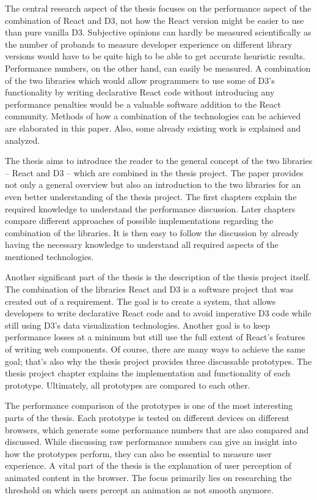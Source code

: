 The central research aspect of the thesis focuses on the performance aspect of the combination of React and D3, not how the React version might be easier to use than pure vanilla D3. Subjective opinions can hardly be measured scientifically as the number of probands to measure developer experience on different library versions would have to be quite high to be able to get accurate heuristic results. Performance numbers, on the other hand, can easily be measured. A combination of the two libraries which would allow programmers to use some of D3's functionality by writing declarative React code without introducing any performance penalties would be a valuable software addition to the React community. Methods of how a combination of the technologies can be achieved are elaborated in this paper. Also, some already existing work is explained and analyzed.

The thesis aims to introduce the reader to the general concept of the two libraries -- React and D3 -- which are combined in the thesis project. The paper provides not only a general overview but also an introduction to the two libraries for an even better understanding of the thesis project. The first chapters explain the required knowledge to understand the performance discussion. Later chapters compare different approaches of possible implementations regarding the combination of the libraries. It is then easy to follow the discussion by already having the necessary knowledge to understand all required aspects of the mentioned technologies.

Another significant part of the thesis is the description of the thesis project itself. The combination of the libraries React and D3 is a software project that was created out of a requirement. The goal is to create a system, that allows developers to write declarative React code and to avoid imperative D3 code while still using D3's data visualization technologies. Another goal is to keep performance losses at a minimum but still use the full extent of React's features of writing web components. Of course, there are many ways to achieve the same goal; that's also why the thesis project provides three discussable prototypes. The thesis project chapter explains the implementation and functionality of each prototype. Ultimately, all prototypes are compared to each other.

The performance comparison of the prototypes is one of the most interesting parts of the thesis. Each prototype is tested on different devices on different browsers, which generate some performance numbers that are also compared and discussed. While discussing raw performance numbers can give an insight into how the prototypes perform, they can also be essential to measure user experience. A vital part of the thesis is the explanation of user perception of animated content in the browser. The focus primarily lies on researching the threshold on which users percept an animation as not smooth anymore.

